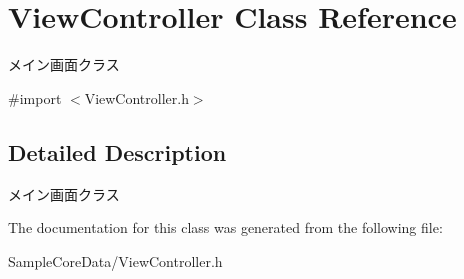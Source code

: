 \hypertarget{interface_view_controller}{\section{View\-Controller Class Reference}
\label{interface_view_controller}
}


メイン画面クラス  




{\ttfamily \#import $<$View\-Controller.\-h$>$}



\subsection{Detailed Description}
メイン画面クラス 

The documentation for this class was generated from the following file\-:\begin{DoxyCompactItemize}
\item 
Sample\-Core\-Data/View\-Controller.\-h\end{DoxyCompactItemize}
